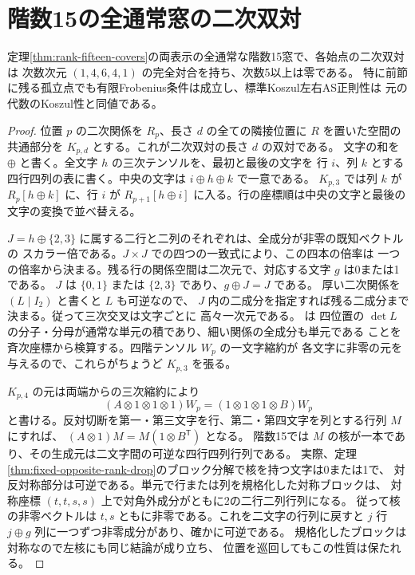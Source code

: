\section{階数15の全通常窓の二次双対}
\label{sec:rank-fifteen-quadratic-dual}
\begin{theorem}\label{thm:rank-fifteen-quadratic-dual}
定理\ref{thm:rank-fifteen-covers}の両表示の全通常な階数15窓で、各始点の二次双対は
次数次元 $(1,4,6,4,1)$ の完全対合を持ち、次数5以上は零である。
特に前節に残る孤立点でも有限Frobenius条件は成立し、標準Koszul左右AS正則性は
元の代数のKoszul性と同値である。
\end{theorem}
\begin{proof}
位置 $p$ の二次関係を $R_p$、長さ $d$ の全ての隣接位置に $R$ を置いた空間の
共通部分を $K_{p,d}$ とする。これが二次双対の長さ $d$ の双対である。
文字の和を $\oplus$ と書く。全文字 $h$ の三次テンソルを、最初と最後の文字を
行 $i$、列 $k$ とする四行四列の表に書く。中央の文字は $i\oplus h\oplus k$ で一意である。
$K_{p,3}$ では列 $k$ が $R_p[h\oplus k]$ に、行 $i$ が
$R_{p+1}[h\oplus i]$ に入る。行の座標順は中央の文字と最後の文字の変換で並べ替える。

$J=h\oplus\{2,3\}$ に属する二行と二列のそれぞれは、全成分が非零の既知ベクトルの
スカラー倍である。$J\times J$ での四つの一致式により、この四本の倍率は
一つの倍率から決まる。残る行の関係空間は二次元で、対応する文字 $g$ は0または1である。
$J$ は $\{0,1\}$ または $\{2,3\}$ であり、$g\oplus J=J$ である。
厚い二次関係を $(L\mid I_2)$ と書くと $L$ も可逆なので、
$J$ 内の二成分を指定すれば残る二成分まで決まる。従って三次交叉は文字ごとに
高々一次元である。 は
四位置の $\det L$ の分子・分母が通常な単元の積であり、細い関係の全成分も単元である
ことを斉次座標から検算する。四階テンソル $W_p$ の一文字縮約が
各文字に非零の元を与えるので、これらがちょうど $K_{p,3}$ を張る。

$K_{p,4}$ の元は両端からの三次縮約により
\[
 (A\otimes1\otimes1\otimes1)W_p
   =(1\otimes1\otimes1\otimes B)W_p
\]
と書ける。反対切断を第一・第三文字を行、第二・第四文字を列とする行列 $M$ にすれば、
$(A\otimes1)M=M(1\otimes B^{\mathsf T})$ となる。
階数15では $M$ の核が一本であり、その生成元は二文字間の可逆な四行四列行列である。
実際、定理\ref{thm:fixed-opposite-rank-drop}のブロック分解で核を持つ文字は0または1で、
対反対称部分は可逆である。単元で行または列を規格化した対称ブロックは、
対称座標 $(t,t,s,s)$ 上で対角外成分がともに2の二行二列行列になる。
従って核の非零ベクトルは $t,s$ ともに非零である。これを二文字の行列に戻すと
$j$ 行 $j\oplus g$ 列に一つずつ非零成分があり、確かに可逆である。
規格化したブロックは対称なので左核にも同じ結論が成り立ち、
位置を巡回してもこの性質は保たれる。


\end{proof}
